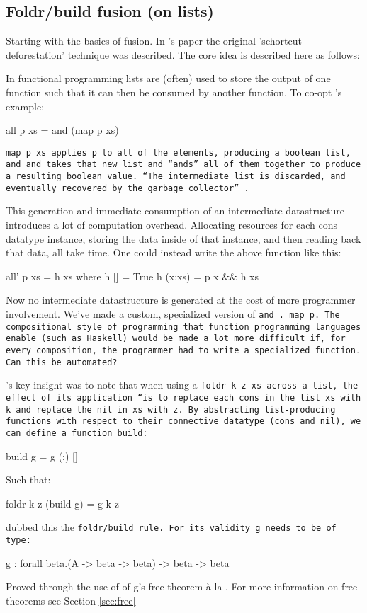 \subsection{Foldr/build fusion (on lists)}
Starting with the basics of fusion. In \cite{Gill1993}'s paper the original 'schortcut deforestation' technique was described. The core idea is described here as follows:

In functional programming lists are (often) used to store the output of one function such that it can then be consumed by another function. To co-opt \cite{Gill1993}'s example:
\begin{code}
    all p xs = and (map p xs)
\end{code}

\tt{map p xs} applies \tt{p} to all of the elements, producing a boolean list, and \tt{and} takes that new list and ``ands'' all of them together to produce a resulting boolean value. ``The intermediate list is discarded, and eventually recovered by the garbage collector'' \citep{Gill1993}.

This generation and immediate consumption of an intermediate datastructure introduces a lot of computation overhead. Allocating resources for each cons datatype instance, storing the data inside of that instance, and then reading back that data, all take time. One could instead write the above function like this:
\begin{code}
    all' p xs = h xs
      where h []     = True
            h (x:xs) = p x && h xs
\end{code}
Now no intermediate datastructure is generated at the cost of more programmer involvement. We've made a custom, specialized version of \tt{and~.~map~p}. The compositional style of programming that function programming languages enable (such as Haskell) would be made a lot more difficult if, for every composition, the programmer had to write a specialized function. Can this be automated?

\cite{Gill1993}'s key insight was to note that when using a \tt{foldr k z xs} across a list, the effect of its application ``is to replace each \tt{cons} in the list \tt{xs} with k and replace the \tt{nil} in \tt{xs} with \tt{z}. By abstracting list-producing functions with respect to their connective datatype (\tt{cons} and \tt{nil}), we can define a function \tt{build}:
\begin{code}
    build g = g (:) []
\end{code}
Such that:
\begin{code}
    foldr k z (build g) = g k z
\end{code}
\cite{Gill1993} dubbed this the \tt{foldr/build} rule. For its validity \tt{g} needs to be of type:
\begin{code}
    g : forall beta.(A -> beta -> beta) -> beta -> beta
\end{code}
Proved through the use of of g's free theorem \`a la \cite{Wadler1989}. For more information on free theorems see Section \ref{sec:free}


